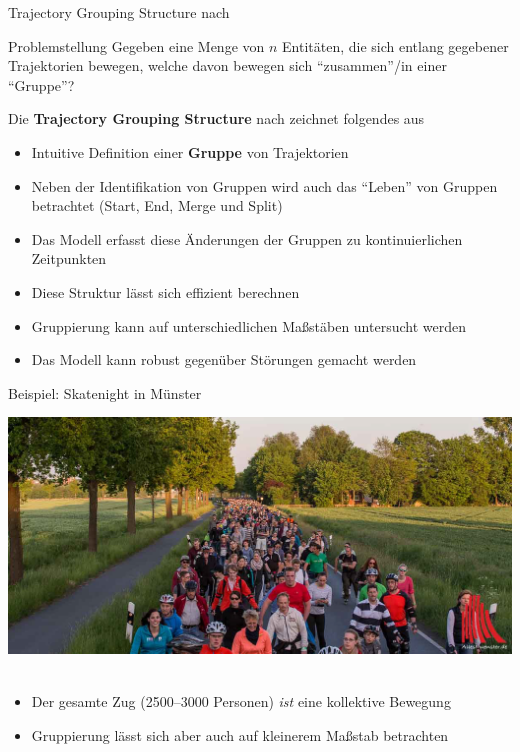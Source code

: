 \documentclass[
wide,
10pt,
xcolor={x11names,svgnames},
hyperref={pdfauthor={Jannes Bantje},colorlinks,urlcolor=maincolor,hidelinks=false,linkcolor=maincolor},
pantone312, 	%
euler-digits,
]{beamer}
\newcommand{\bet}[1]{\textbf{\color{maincolor}#1}}
\theoremstyle{definition}
\begin{document}
\begin{frame}{Trajectory Grouping Structure nach \textcite{buchin2015}}
    \begin{block}{Problemstellung}
        Gegeben eine Menge von $n$ Entitäten, die sich entlang gegebener Trajektorien bewegen, welche davon bewegen sich \enquote{zusammen}/in einer \enquote{Gruppe}?
    \end{block}
    Die \bet{Trajectory Grouping Structure} nach \textcite{buchin2015} zeichnet folgendes aus\pause
    \begin{itemize}[<+->]
        \item Intuitive Definition einer \bet{Gruppe} von Trajektorien
        \item Neben der Identifikation von Gruppen wird auch das \enquote{Leben} von Gruppen betrachtet (Start, End, Merge und Split)
        \item Das Modell erfasst diese Änderungen der Gruppen zu kontinuierlichen Zeitpunkten
        \item Diese Struktur lässt sich effizient berechnen
        \item Gruppierung kann auf unterschiedlichen Maßstäben untersucht werden
        \item Das Modell kann robust gegenüber Störungen gemacht werden
    \end{itemize}
\end{frame}

\begin{frame}{Beispiel: Skatenight in Münster}
    \begin{minipage}{\textwidth}
        \includegraphics[height=.73\textheight]{Bilder/skatenight2_2015_ml-20}\,
    \end{minipage}
    \begin{itemize}
        \item<2-> Der gesamte Zug (2500--3000 Personen) \emph{ist} eine kollektive Bewegung
        \item<3-> Gruppierung lässt sich aber auch auf kleinerem Maßstab betrachten
    \end{itemize}
\end{frame}
\end{document}

